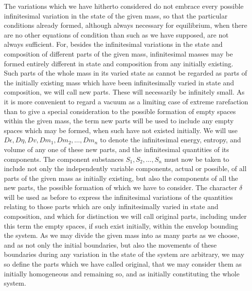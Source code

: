 \documentclass[11pt]{article}
\begin{document}
The variations which we have hitherto considered do not embrace every possible infinitesimal variation in the state of the given mass, so that the particular conditions already formed, although always necessary for equilibrium, when there are no other equations of condition than such as we have supposed, are not always sufficient. For, besides the infinitesimal variations in the state and composition of different parts of the given mass, infinitesimal masses may be formed entirely different in state and composition from any initially existing. Such parts of the whole mass in its varied state as cannot be regarded as parts of the initially existing mass which have been infinitesimally varied in state and composition, we will call new parts. These will necessarily be infinitely small. As it is more convenient to regard a vacuum as a limiting case of extreme rarefaction than to give a special consideration to the possible formation of empty spaces within the given mass, the term new parts will be used to include any empty spaces which may be formed, when such have not existed initially. We will use \(D\epsilon,D\eta,Dv,Dm_1,Dm_2,\ldots,Dm_n\) to denote the infinitesimal energy, entropy, and volume of any one of these new parts, and the infinitesimal quantities of its components. The component substances \(S_1,S_2,\ldots,S_n\) must now be taken to include not only the independently variable components, actual or possible, of all parts of the given mass as initially existing, but also the components of all the new parts, the possible formation of which we have to consider. The character \(\delta\) will be used as before to express the infinitesimal variations of the quantities relating to those parts which are only infinitesimally varied in state and composition, and which for distinction we will call original parts, including under this term the empty spaces, if such exist initially, within the envelop bounding the system. As we may divide the given mass into as many parts as we choose, and as not only the initial boundaries, but also the movements of these boundaries during any variation in the state of the system are arbitrary, we may so define the parts which we have called original, that we may consider them as initially homogeneous and remaining so, and as initially constituting the whole system.
\end{document}
